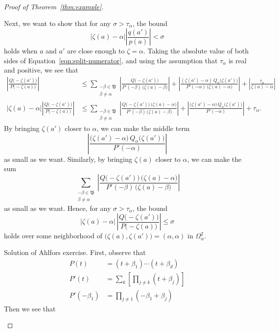 \documentclass{article}
\theoremstyle{definition}
\theoremstyle{plain}
\newcommand{\roots}{\mathfrak{B}}
\newcommand{\domain}{\Omega}
\newenvironment{verify}{\color{ForestGreen}}{\color{black}}
\begin{document}
\begin{proof}[Proof of Theorem~\ref{thm:example}]
\begin{itemize}
Next, we want to show that for any $\sigma > \tau_\alpha$, the bound
\[ |\zeta(a) - \alpha| \left|\frac{q(a')}{p(a)}\right| < \sigma \]
holds when $a$ and $a'$ are close enough to $\zeta = \alpha$. Taking the absolute value of both sides of Equation~\eqref{eqn:split-numerator}, and using the assumption that $\tau_\alpha$ is real and positive, we see that
\begin{align*}
\left|\frac{Q\big(-\zeta(a')\big)}{P\big(-\zeta(a)\big)}\right| & \le \sum_{\substack{-\beta \in \roots \\ \beta \neq \alpha}} \left|\frac{Q\big(-\zeta(a')\big)}{P'(-\beta)\,\big(\zeta(a) - \beta\big)}\right| + \left|\frac{(\zeta(a') - \alpha)\,Q_\alpha\big(\zeta(a')\big)}{P'(-\alpha)\,\big(\zeta(a) - \alpha\big)}\right| + \left|\frac{\tau_\alpha}{\zeta(a) - \alpha}\right| \\
|\zeta(a) - \alpha|\left|\frac{Q\big(-\zeta(a')\big)}{P\big(-\zeta(a)\big)}\right| & \le \sum_{\substack{-\beta \in \roots \\ \beta \neq \alpha}} \left|\frac{Q\big(-\zeta(a')\big)\,\big(\zeta(a) - \alpha\big)}{P'(-\beta)\,\big(\zeta(a) - \beta\big)}\right| + \left|\frac{\big(\zeta(a') - \alpha\big)\,Q_\alpha\big(\zeta(a')\big)}{P'(-\alpha)}\right| + \tau_\alpha.
\end{align*}
By bringing $\zeta(a')$ closer to $\alpha$, we can make the middle term
\[\left|\frac{\big(\zeta(a') - \alpha\big)\,Q_\alpha\big(\zeta(a')\big)}{P'(-\alpha)}\right|\]
as small as we want. Similarly, by bringing $\zeta(a)$ closer to $\alpha$, we can make the sum
\[\sum_{\substack{-\beta \in \roots \\ \beta \neq \alpha}} \left|\frac{Q\big(-\zeta(a')\big)\,\big(\zeta(a) - \alpha\big)}{P'(-\beta)\,\big(\zeta(a) - \beta\big)}\right|\]
as small as we want. Hence, for any $\sigma > \tau_\alpha$, the bound
\[|\zeta(a)-\alpha| \, \left|\frac{Q\big(-\zeta(a')\big)}{P\big(-\zeta(a)\big)}\right| \le \sigma \]
holds over some neighborhood of $\big(\zeta(a), \zeta(a')\big) = (\alpha, \alpha)$ in $\domain_\alpha^2$.
\begin{verify}
\par Solution of Ahlfors exercise. First, observe that
\begin{align*}
P(t) &= (t + \beta_1) \cdots (t + \beta_d) \\
P'(t) &= \sum_k \left[ \prod_{j \neq k} (t + \beta_j) \right] \\
P'(-\beta_1) &= \prod_{j\neq 1} (-\beta_1 + \beta_j) 
\end{align*}
Then we see that

\end{verify}
\end{itemize}
\end{proof}
\end{document}
